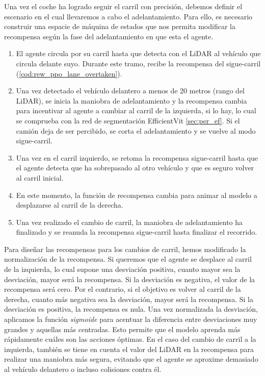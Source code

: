 Una vez el coche ha logrado seguir el carril con precisión, debemos definir el escenario en el cual llevaremos a cabo el adelantamiento. Para ello, es necesario construir una espacie de máquina de estados que nos permita modificar la recompensa según la fase del adelantamiento en que esta el agente.
\begin{enumerate}
\item El agente circula por su carril hasta que detecta con el \ac{LiDAR} al vehículo que circula delante suyo. Durante este tramo, recibe la recompensa del sigue-carril (\ref{cod:rew_ppo_lane_overtaken}).
\item Una vez detectado el vehículo delantero a menos de 20 metros (rango del \ac{LiDAR}), se inicia la maniobra de adelantamiento y la recompensa cambia para incentivar al agente a cambiar al carril de la izquierda, si lo hay, lo cual se comprueba con la red de segmentación EfficientVit \ref{sec:per_ef}. Si el camión deja de ser percibido, se corta el adelantamiento y se vuelve al modo sigue-carril.
\item Una vez en el carril izquierdo, se retoma la recompensa sigue-carril hasta que el agente detecta que ha sobrepasado al otro vehículo y que es seguro volver al carril inicial.
\item En este momento, la función de recompensa cambia para animar al modelo a desplazarse al carril de la derecha.
\item Una vez realizado el cambio de carril, la maniobra de adelantamiento ha finalizado y se reanuda la recompensa sigue-carril hasta finalizar el recorrido.
\end{enumerate}

Para diseñar las recompensas para los cambios de carril, hemos modificado la normalización de la recompensa. Si queremos que el agente se desplace al carril de la izquierda, lo cual supone una desviación positiva, cuanto mayor sea la desviación, mayor será la recompensa. Si la desviación es negativa, el valor de la recompensa será cero. Por el contrario, si el objetivo es volver al carril de la derecha, cuanto más negativa sea la desviación, mayor será la recompensa. Si la desviación es positiva, la recompensa es nula. Una vez normalizada la desviación, aplicamos la función \textit{sigmoide} para acentuar la diferencia entre desviaciones muy grandes y aquellas más centradas. Esto permite que el modelo aprenda más rápidamente cuáles son las acciones óptimas. En el caso del cambio de carril a la izquierda, también se tiene en cuenta el valor del \ac{LiDAR} en la recompensa para realizar una maniobra más segura, evitando que el agente se aproxime demasiado al vehículo delantero o incluso colisiones contra él.

